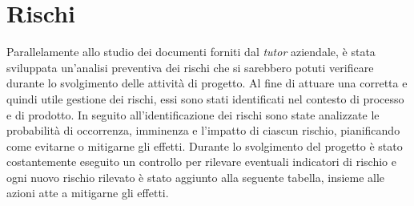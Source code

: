 \newpage

\section{Rischi}

Parallelamente allo studio dei documenti forniti dal \textit{tutor} aziendale, è stata sviluppata un'analisi preventiva dei rischi che si sarebbero potuti verificare durante lo svolgimento delle attività di progetto. Al fine di attuare una corretta e quindi utile gestione dei rischi, essi sono stati identificati nel contesto di processo e di prodotto. In seguito all'identificazione dei rischi sono state analizzate le probabilità di occorrenza, imminenza e l'impatto di ciascun rischio, pianificando come evitarne o mitigarne gli effetti. Durante lo svolgimento del progetto è stato costantemente eseguito un controllo per rilevare eventuali indicatori di rischio e ogni nuovo rischio rilevato è stato aggiunto alla seguente tabella, insieme alle azioni atte a mitigarne gli effetti.

